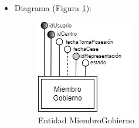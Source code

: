 \begin{itemize}
\begin{itemize}
        \item fechaTomaPosesión
        \begin{itemize}
            \item Definición: fecha de toma de posesión del miembro de gobierno.
            \item Dominio: 01/01/1970 hasta 31/12/9999.
            \item Tipo: atributo simple.
            \item Opcional: no
            \item Ejemplo: 10/09/2023
        \end{itemize}

        \item fechaCese
        \begin{itemize}
            \item Definición: fecha de cese del miembro de gobierno.
            \item Dominio: 01/01/1970 hasta 31/12/9999.
            \item Tipo: atributo simple.
            \item Opcional: sí
            \item Ejemplo: 10/09/2023
        \end{itemize}

        \item estado
        \begin{itemize}
            \item Definición: estado del miembro del gobierno.
            \item Dominio: 1 (Habilitado), 0 (Deshabilitado).
            \item Tipo: atributo simple.
            \item Opcional: no
            \item Ejemplo: 1
        \end{itemize}
    \end{itemize}

    \item Diagrama (Figura \ref{fig:E-MiembroGobierno}):

    \begin{figure}[H]
        \centering
        \includegraphics[scale=0.8]{img/diagramas/EER/E-MiembroGobierno.png}
        \caption{Entidad MiembroGobierno}
        \label{fig:E-MiembroGobierno}
    \end{figure}


\end{itemize}
